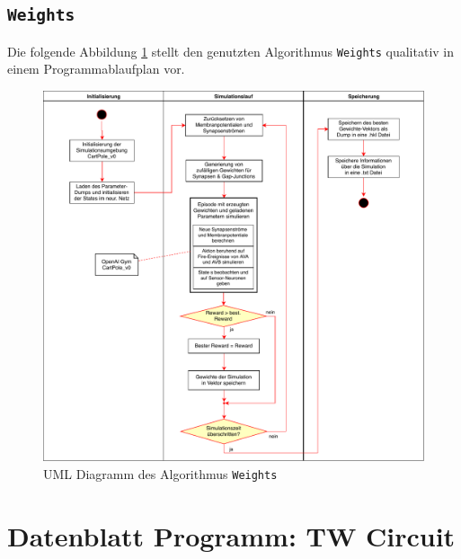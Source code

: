 	\section{\texttt{Weights}}
	\label{app:UML_RS}
	Die folgende Abbildung \ref{fig:uml_weights} stellt den genutzten Algorithmus \texttt{Weights} qualitativ in einem Programmablaufplan vor.
	\begin{figure}[H]
		\centering
		\includegraphics[width=14cm]{figures/appendix/uml_w.pdf}
		\caption{UML Diagramm des Algorithmus \texttt{Weights}}
		\label{fig:uml_weights}
	\end{figure}
	
%
\chapter{Datenblatt Programm: TW Circuit}
%
\label{app:datenblatt}

